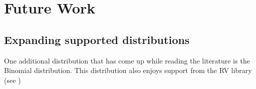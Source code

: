 \chapter{Future Work\label{chap:future-work}}
\section{Expanding supported distributions}
One additional distribution that has come up while reading the literature is the Binomial distribution\cite{Dwork2006}. This distribution also enjoys support from the RV library (see )